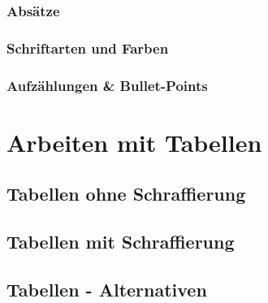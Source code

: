 \documentclass[12pt, a4paper, sectionentrydots=true, listof=totoc, listof=entryprefix, numbers=endperiod]{scrartcl}
\begin{document}
\subsubsection{Absätze}
\begin{spacing}{1.25}

\end{spacing}
%
%
\subsubsection{Schriftarten und Farben}
\begin{spacing}{1.25}

\end{spacing}
%
%
\subsubsection{Aufzählungen \& Bullet-Points}
\begin{spacing}{1.25}

\end{spacing}
%
%
%
%
%
\pagebreak 
\section{Arbeiten mit Tabellen}
\begin{spacing}{1.25}

\end{spacing}
%
%
\subsection{Tabellen ohne Schraffierung}
\begin{spacing}{1.25}

\end{spacing}
%
%
\subsection{Tabellen mit Schraffierung}
\begin{spacing}{1.25}

\end{spacing}
%
%
\subsection{Tabellen - Alternativen}
\begin{spacing}{1.25}

\end{spacing}%
%
%
%
%
%
\pagebreak 
\end{document}
